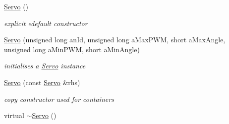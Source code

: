 \begin{DoxyCompactItemize}
\item 
\hyperlink{classRobotInterface_1_1HighLevel_1_1Servo_a55ee280ff7ceb68f1280689c946db913}{Servo} ()\hypertarget{classRobotInterface_1_1HighLevel_1_1Servo_a55ee280ff7ceb68f1280689c946db913}{}\label{classRobotInterface_1_1HighLevel_1_1Servo_a55ee280ff7ceb68f1280689c946db913}

\begin{DoxyCompactList}\small\item\em explicit edefault constructor \end{DoxyCompactList}\item 
\hyperlink{classRobotInterface_1_1HighLevel_1_1Servo_ae6d458646c8b397b78f259e5c487a422}{Servo} (unsigned long an\+Id, unsigned long a\+Max\+P\+WM, short a\+Max\+Angle, unsigned long a\+Min\+P\+WM, short a\+Min\+Angle)
\begin{DoxyCompactList}\small\item\em initialises a \hyperlink{classRobotInterface_1_1HighLevel_1_1Servo}{Servo} instance \end{DoxyCompactList}\item 
\hyperlink{classRobotInterface_1_1HighLevel_1_1Servo_a8359af04d4e43df4da7d122721abe6e6}{Servo} (const \hyperlink{classRobotInterface_1_1HighLevel_1_1Servo}{Servo} \&rhs)
\begin{DoxyCompactList}\small\item\em copy constructor used for containers \end{DoxyCompactList}\item 
virtual \hyperlink{classRobotInterface_1_1HighLevel_1_1Servo_ac1e9f3039c1b88239124746e4901434d}{$\sim$\+Servo} ()\hypertarget{classRobotInterface_1_1HighLevel_1_1Servo_ac1e9f3039c1b88239124746e4901434d}{}\label{classRobotInterface_1_1HighLevel_1_1Servo_ac1e9f3039c1b88239124746e4901434d}


\end{DoxyCompactItemize}
